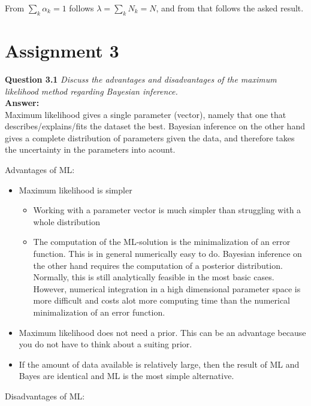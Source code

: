 \documentclass[a4paper]{article}
\begin{document}
From $\sum_k \alpha_k = 1$ follows $\lambda = \sum_k N_k = N$, and from that follows the asked result.


\section*{Assignment 3}

\textbf{Question 3.1}  \textit{Discuss the advantages and disadvantages of the maximum likelihood method regarding Bayesian inference.}\\

\textbf{Answer:}\\

Maximum likelihood gives a single parameter (vector), namely that one that describes/explains/fits the dataset the best. Bayesian inference on the other hand gives a complete distribution of parameters given the data, and therefore takes the uncertainty in the parameters into acount.

Advantages of ML:

\begin{itemize}
	\item Maximum likelihood is simpler
		\begin{itemize}
			\item Working with a parameter vector is much simpler than struggling with a whole distribution
			\item The computation of the ML-solution is the minimalization of an error function. This is in general numerically easy to do. Bayesian inference on the other hand requires the computation of a posterior distribution. Normally, this is still analytically feasible  in the most basic cases. However, numerical integration in a high dimensional parameter space is more difficult and costs alot more computing time than the numerical minimalization of an error function.
		\end{itemize}
	\item Maximum likelihood does not need a prior. This can be an advantage because you do not have to think about a suiting prior.	
	\item If the amount of data available is relatively large, then the result of ML and Bayes are identical and ML is the most simple alternative.
\end{itemize}

Disadvantages of ML:
\end{document}
